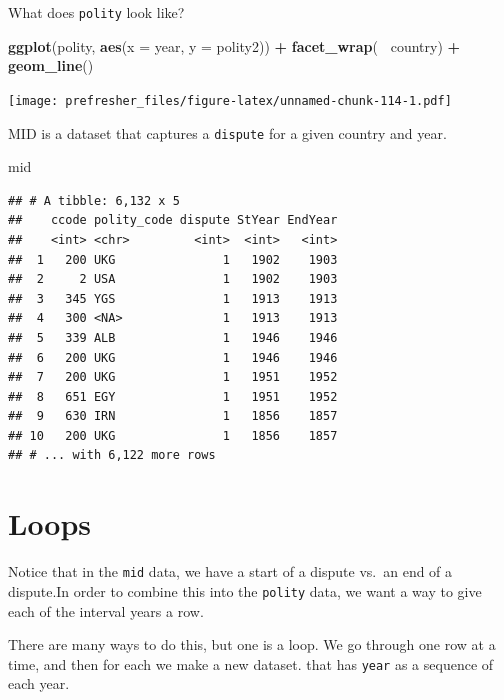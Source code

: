 \documentclass[]{book}
\newenvironment{Shaded}{\begin{snugshade}}{\end{snugshade}}
\newcommand{\KeywordTok}[1]{\textcolor[rgb]{0.13,0.29,0.53}{\textbf{#1}}}
\newcommand{\DataTypeTok}[1]{\textcolor[rgb]{0.13,0.29,0.53}{#1}}
\newcommand{\StringTok}[1]{\textcolor[rgb]{0.31,0.60,0.02}{#1}}
\newcommand{\OperatorTok}[1]{\textcolor[rgb]{0.81,0.36,0.00}{\textbf{#1}}}
\newcommand{\NormalTok}[1]{#1}
\theoremstyle{definition}
\theoremstyle{definition}
\theoremstyle{definition}
\theoremstyle{remark}
\begin{document}
What does \texttt{polity} look like?

\begin{Shaded}
\begin{Highlighting}[]
\KeywordTok{ggplot}\NormalTok{(polity, }\KeywordTok{aes}\NormalTok{(}\DataTypeTok{x =}\NormalTok{ year, }\DataTypeTok{y =}\NormalTok{ polity2)) }\OperatorTok{+}
\StringTok{  }\KeywordTok{facet_wrap}\NormalTok{(}\OperatorTok{~}\StringTok{ }\NormalTok{country) }\OperatorTok{+}
\StringTok{  }\KeywordTok{geom_line}\NormalTok{()}
\end{Highlighting}
\end{Shaded}

\texttt{[image: prefresher\_files/figure-latex/unnamed-chunk-114-1.pdf]}

MID is a dataset that captures a \texttt{dispute} for a given country
and year.

\begin{Shaded}
\begin{Highlighting}[]
\NormalTok{mid}
\end{Highlighting}
\end{Shaded}

\begin{verbatim}
## # A tibble: 6,132 x 5
##    ccode polity_code dispute StYear EndYear
##    <int> <chr>         <int>  <int>   <int>
##  1   200 UKG               1   1902    1903
##  2     2 USA               1   1902    1903
##  3   345 YGS               1   1913    1913
##  4   300 <NA>              1   1913    1913
##  5   339 ALB               1   1946    1946
##  6   200 UKG               1   1946    1946
##  7   200 UKG               1   1951    1952
##  8   651 EGY               1   1951    1952
##  9   630 IRN               1   1856    1857
## 10   200 UKG               1   1856    1857
## # ... with 6,122 more rows
\end{verbatim}

\section{Loops}\label{loops}

Notice that in the \texttt{mid} data, we have a start of a dispute
vs.~an end of a dispute.In order to combine this into the
\texttt{polity} data, we want a way to give each of the interval years a
row.

There are many ways to do this, but one is a loop. We go through one row
at a time, and then for each we make a new dataset. that has
\texttt{year} as a sequence of each year.
\end{document}
